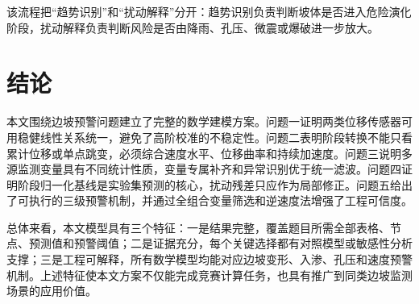 该流程把“趋势识别”和“扰动解释”分开：趋势识别负责判断坡体是否进入危险演化阶段，扰动解释负责判断风险是否由降雨、孔压、微震或爆破进一步放大。

\section{结论}

本文围绕边坡预警问题建立了完整的数学建模方案。问题一证明两类位移传感器可用稳健线性关系统一，避免了高阶校准的不稳定性。问题二表明阶段转换不能只看累计位移或单点跳变，必须综合速度水平、位移曲率和持续加速度。问题三说明多源监测变量具有不同统计性质，变量专属补齐和异常识别优于统一滤波。问题四证明阶段归一化基线是实验集预测的核心，扰动残差只应作为局部修正。问题五给出了可执行的三级预警机制，并通过全组合变量筛选和逆速度法增强了工程可信度。

总体来看，本文模型具有三个特征：一是结果完整，覆盖题目所需全部表格、节点、预测值和预警阈值；二是证据充分，每个关键选择都有对照模型或敏感性分析支撑；三是工程可解释，所有数学模型均能对应边坡变形、入渗、孔压和速度预警机制。上述特征使本文方案不仅能完成竞赛计算任务，也具有推广到同类边坡监测场景的应用价值。
